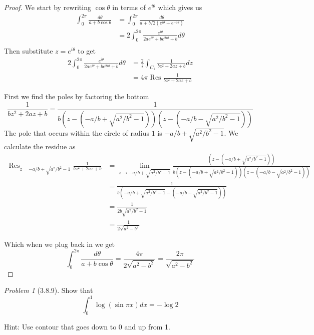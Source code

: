 \documentclass[10pt]{article}
\newcommand{\sk}{\vskip 10mm}
\DeclareMathOperator{\Res}{Res}
\theoremstyle{remark}
\newtheorem{problem}{Problem}
\theoremstyle{remark}
\begin{document}
\begin{proof}
  We start by rewriting $\cos\theta$ in terms of $e^{i\theta}$ which gives us
  \begin{align*}
    \int_0^{2\pi}\frac{d\theta}{a+b\cos\theta} &= \int_0^{2\pi}\frac{d\theta}{a+b/2(e^{i\theta}+e^{-i\theta})}\\
                                            &= 2\int_0^{2\pi}\frac{e^{i\theta}}{2ae^{i\theta}+be^{2i\theta}+b}d\theta\\
  \end{align*}
  Then substitute $z=e^{i\theta}$ to get
  \begin{align*}
    2\int_0^{2\pi}\frac{e^{i\theta}}{2ae^{i\theta}+be^{2i\theta}+b}d\theta&= \frac{2}{i}\int_{C_1}\frac{1}{bz^2+2az+b}dz\\
                                                                     &= 4\pi\Res\frac{1}{bz^2+2az+b}
  \end{align*}

  First we find the poles by factoring the bottom
  \[
    \frac{1}{bz^2+2az+b}=\frac{1}{b(z-(-a/b+\sqrt{a^2/b^2-1}))(z-(-a/b-\sqrt{a^2/b^2-1}))}
  \]
  The pole that occurs within the circle of radius $1$ is $-a/b+\sqrt{a^2/b^2-1}$. We
  calculate the residue as
  \begin{align*}
    \Res_{z=-a/b+\sqrt{a^2/b^2-1}} \frac{1}{bz^2+2az+b} &= \lim_{z\rightarrow -a/b+\sqrt{a^2/b^2-1}}\frac{(z-(-a/b+\sqrt{a^2/b^2-1}))}{b(z-(-a/b+\sqrt{a^2/b^2-1}))(z-(-a/b-\sqrt{a^2/b^2-1}))}\\
                                                     &=\frac{1}{b(-a/b+\sqrt{a^2/b^2-1}-(-a/b-\sqrt{a^2/b^2-1}))}\\
                                                     &=\frac{1}{2b\sqrt{a^2/b^2-1}}\\
                                                     &=\frac{1}{2\sqrt{a^2-b^2}}
  \end{align*}

  Which when we plug back in we get
  \[
    \int_0^{2\pi}\frac{d\theta}{a+b\cos\theta}=\frac{4\pi}{2\sqrt{a^2-b^2}}=\frac{2\pi}{\sqrt{a^2-b^2}}
  \]
\end{proof}

\sk

\begin{problem}[3.8.9]
  Show that
  \[
    \int_0^1\log(\sin\pi x)dx = -\log 2
  \]

  Hint: Use contour that goes down to 0 and up from 1.
\end{problem}
\end{document}
